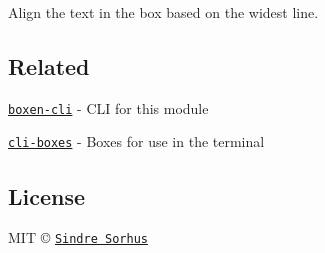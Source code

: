 Align the text in the box based on the widest line.

\subsection*{Related}


\begin{DoxyItemize}
\item \href{https://github.com/sindresorhus/boxen-cli}{\tt boxen-\/cli} -\/ C\+LI for this module
\item \href{https://github.com/sindresorhus/cli-boxes}{\tt cli-\/boxes} -\/ Boxes for use in the terminal
\end{DoxyItemize}

\subsection*{License}

M\+IT © \href{https://sindresorhus.com}{\tt Sindre Sorhus} 